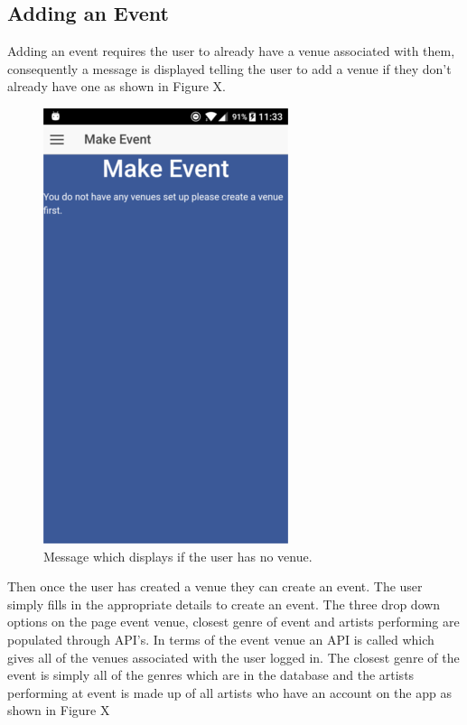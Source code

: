 \subsection{Adding an Event}
Adding an event requires the user to already have a venue associated with them, consequently a message is displayed telling the user to add a venue if they don't already have one as shown in Figure X.

\begin{figure}[H]
\includegraphics[scale=0.5]{images/sc14}
\caption{Message which displays if the user has no venue.}
\end{figure}

Then once the user has created a venue they can create an event. The user simply fills in the appropriate details to create an event. The three drop down options on the page event venue, closest genre of event and artists performing are populated through API's. In terms of the event venue an API is called which gives all of the venues associated with the user logged in. The closest genre of the event is simply all of the genres which are in the database and the artists performing at event is made up of all artists who have an account on the app as shown in Figure X

